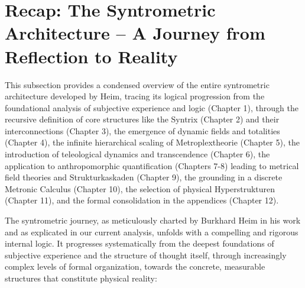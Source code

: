 \documentclass[
    12pt,              %
    a4paper,           %
    headings=normal,   %
    twoside=true,      %
    BCOR=8mm,          %
]{scrbook}
\begin{document}
\section{Recap: The Syntrometric Architecture – A Journey from Reflection to Reality}
\label{sec:recap_architecture}
This subsection provides a condensed overview of the entire syntrometric architecture developed by Heim, tracing its logical progression from the foundational analysis of subjective experience and logic (Chapter 1), through the recursive definition of core structures like the Syntrix (Chapter 2) and their interconnections (Chapter 3), the emergence of dynamic fields and totalities (Chapter 4), the infinite hierarchical scaling of Metroplextheorie (Chapter 5), the introduction of teleological dynamics and transcendence (Chapter 6), the application to anthropomorphic quantification (Chapters 7-8) leading to metrical field theories and Strukturkaskaden (Chapter 9), the grounding in a discrete Metronic Calculus (Chapter 10), the selection of physical Hyperstrukturen (Chapter 11), and the formal consolidation in the appendices (Chapter 12).

The syntrometric journey, as meticulously charted by Burkhard Heim in his work and as explicated in our current analysis, unfolds with a compelling and rigorous internal logic. It progresses systematically from the deepest foundations of subjective experience and the structure of thought itself, through increasingly complex levels of formal organization, towards the concrete, measurable structures that constitute physical reality:
\end{document}
